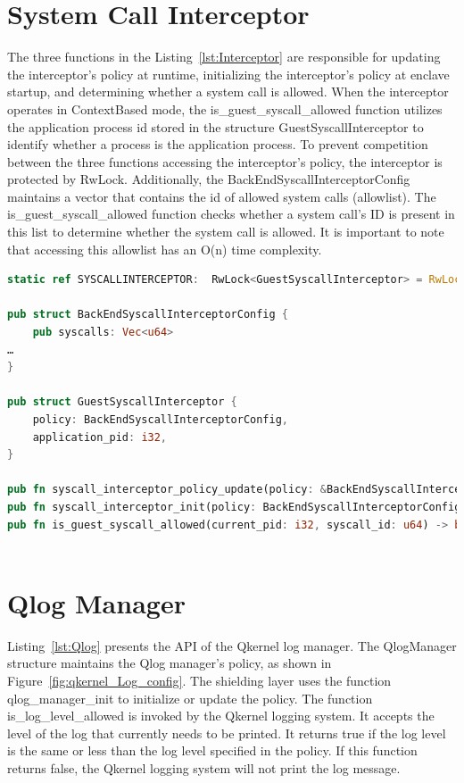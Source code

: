 \section{System Call Interceptor}
\label{sec:impl_interceptor}
The three functions in the Listing~\ref{lst:Interceptor} are responsible for updating the interceptor’s policy at runtime, initializing the interceptor’s policy at enclave startup, and determining whether a system call is allowed. When the interceptor operates in ContextBased mode, 
the is\_guest\_syscall\_allowed function utilizes the application process id stored in the structure GuestSyscallInterceptor to identify whether a process is the application process. To prevent competition between the three functions accessing the interceptor's policy, the interceptor is 
protected by RwLock. Additionally, the BackEndSyscallInterceptorConfig maintains a vector that contains the id of allowed system calls (allowlist). The is\_guest\_syscall\_allowed function checks whether a system call's ID is present in this list to determine whether the system call is allowed. 
It is important to note that accessing this allowlist has an O(n) time complexity.

\begin{lstlisting}[language=rust, caption= API of system call interceptor, label={lst:Interceptor}]
static ref SYSCALLINTERCEPTOR:  RwLock<GuestSyscallInterceptor> = RwLock::new(GuestSyscallInterceptor::default());

pub struct BackEndSyscallInterceptorConfig {
    pub syscalls: Vec<u64>
…
}

pub struct GuestSyscallInterceptor {
    policy: BackEndSyscallInterceptorConfig,
    application_pid: i32,
}

pub fn syscall_interceptor_policy_update(policy: &BackEndSyscallInterceptorConfig) -> Result<()> 
pub fn syscall_interceptor_init(policy: BackEndSyscallInterceptorConfig) -> Result<()> 
pub fn is_guest_syscall_allowed(current_pid: i32, syscall_id: u64) -> bool
    
\end{lstlisting}


\section{Qlog Manager}
\label{sec:iml_qlog}
Listing~\ref{lst:Qlog} presents the API of the Qkernel log manager. The QlogManager structure maintains the Qlog manager's policy, as shown in Figure~\ref{fig:qkernel_Log_config}. The shielding layer uses the function  qlog\_manager\_init to initialize or update the policy. 
The function is\_log\_level\_allowed  is invoked by 
the Qkernel logging system. It accepts the level of the log that currently needs to be printed. It returns true if the log level is the same or less than the log level specified in the policy. If this function returns false, the Qkernel logging system will not print the log message.

